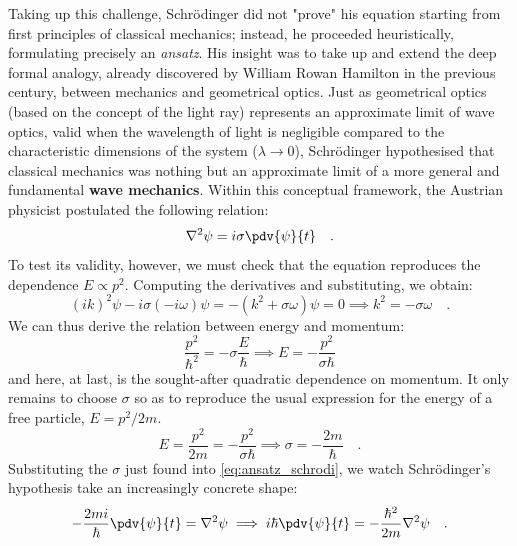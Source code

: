 Taking up this challenge, Schrödinger did not "prove" his equation starting from first principles of classical mechanics; instead, he proceeded heuristically, formulating precisely an \textit{ansatz}. His insight was to take up and extend the deep formal analogy, already discovered by William Rowan Hamilton in the previous century, between mechanics and geometrical optics. Just as geometrical optics (based on the concept of the light ray) represents an approximate limit of wave optics, valid when the wavelength of light is negligible compared to the characteristic dimensions of the system ($\lambda \to 0$), Schrödinger hypothesised that classical mechanics was nothing but an approximate limit of a more general and fundamental \textbf{wave mechanics}. Within this conceptual framework, the Austrian physicist postulated the following relation:
\begin{equation}
    \nabla^2\psi = i\sigma\pdv{\psi}{t}  \quad.
    \label{eq:ansatz_schrodi}
\end{equation}
To test its validity, however, we must check that the equation reproduces the dependence $E \propto p^2$. Computing the derivatives and substituting, we obtain:
\[
        (ik)^2\psi - i\sigma(-i\omega)\psi = -(k^2 + \sigma\omega)\psi = 0 \implies k^2 = -\sigma \omega \quad. 
\]
We can thus derive the relation between energy and momentum:
\[
    \frac{p^2}{\hbar^2} = - \sigma \frac{E}{\hbar} \implies E = -\frac{p^2}{\sigma \hbar}
\]
and here, at last, is the sought-after quadratic dependence on momentum. It only remains to choose $\sigma$ so as to reproduce the usual expression for the energy of a free particle, $E = p^2/2m$.
\[
    E = \frac{p^2}{2m} = -\frac{p^2}{\sigma \hbar} \implies \sigma = -\frac{2m}{\hbar}
\quad.
\]
Substituting the $\sigma$ just found into \eqref{eq:ansatz_schrodi}, we watch Schrödinger's hypothesis take an increasingly concrete shape:
\begin{equation}
        -\frac{2mi}{\hbar} \pdv{\psi}{t} = \nabla^2\psi \implies
        {i\hbar \pdv{\psi}{t} = -\frac{\hbar^2}{2m}\nabla^2\psi} \quad.  
    \label{eq:schrodi_cin}
\end{equation}

